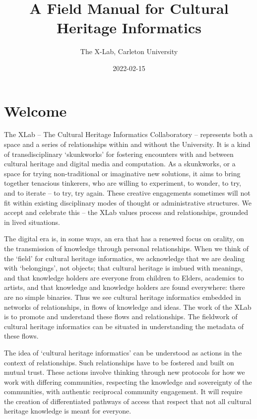 \documentclass[
]{book}
\title{A Field Manual for Cultural Heritage Informatics}
\author{The X-Lab, Carleton University}
\date{2022-02-15}
\begin{document}
\maketitle

{
\setcounter{tocdepth}{1}
\tableofcontents
}
\hypertarget{welcome}{%
\chapter{Welcome}\label{welcome}}

The XLab -- The Cultural Heritage Informatics Collaboratory -- represents both a space and a series of relationships within and without the University. It is a kind of transdisciplinary `skunkworks' for fostering encounters with and between cultural heritage and digital media and computation. As a skunkworks, or a space for trying non-traditional or imaginative new solutions, it aims to bring together tenacious tinkerers, who are willing to experiment, to wonder, to try, and to iterate -- to try, try again. These creative engagements sometimes will not fit within existing disciplinary modes of thought or administrative structures. We accept and celebrate this -- the XLab values process and relationships, grounded in lived situations.

The digital era is, in some ways, an era that has a renewed focus on orality, on the transmission of knowledge through personal relationships. When we think of the `field' for cultural heritage informatics, we acknowledge that we are dealing with `belongings', not objects; that cultural heritage is imbued with meanings, and that knowledge holders are everyone from children to Elders, academics to artists, and that knowledge and knowledge holders are found everywhere: there are no simple binaries. Thus we see cultural heritage informatics embedded in networks of relationships, in flows of knowledge and ideas. The work of the XLab is to promote and understand these flows and relationships. The fieldwork of cultural heritage informatics can be situated in understanding the metadata of these flows.

The idea of `cultural heritage informatics' can be understood as actions in the context of relationships. Such relationships have to be fostered and built on mutual trust. These actions involve thinking through new protocols for how we work with differing communities, respecting the knowledge and sovereignty of the communities, with authentic reciprocal community engagement. It will require the creation of differentiated pathways of access that respect that not all cultural heritage knowledge is meant for everyone.
\end{document}
